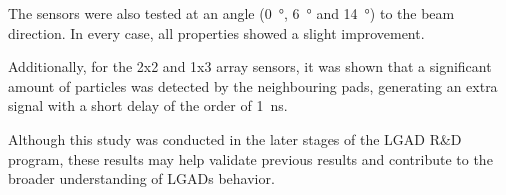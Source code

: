 The sensors were also tested at an angle (\qty{0}{\degree}, \qty{6}{\degree} and \qty{14}{\degree}) to the beam direction. In every case, all properties showed a slight improvement. 

Additionally, for the 2x2 and 1x3 array sensors, it was shown that a significant amount of particles was detected by the neighbouring pads, generating an extra signal with a short delay of the order of \qty{1}{\nano\second}.

Although this study was conducted in the later stages of the LGAD R\&D program, these results may help validate previous results and contribute to the broader understanding of LGADs behavior.

